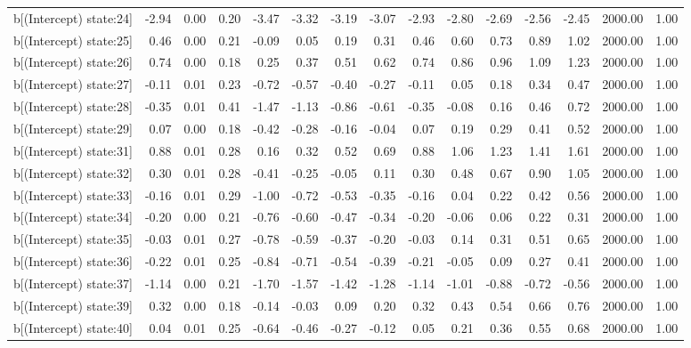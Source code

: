 \begin{table}[ht]
\begin{tabular}{rrrrrrrrrrrrrrr}
  b[(Intercept) state:24] & -2.94 & 0.00 & 0.20 & -3.47 & -3.32 & -3.19 & -3.07 & -2.93 & -2.80 & -2.69 & -2.56 & -2.45 & 2000.00 & 1.00 \\ 
  b[(Intercept) state:25] & 0.46 & 0.00 & 0.21 & -0.09 & 0.05 & 0.19 & 0.31 & 0.46 & 0.60 & 0.73 & 0.89 & 1.02 & 2000.00 & 1.00 \\ 
  b[(Intercept) state:26] & 0.74 & 0.00 & 0.18 & 0.25 & 0.37 & 0.51 & 0.62 & 0.74 & 0.86 & 0.96 & 1.09 & 1.23 & 2000.00 & 1.00 \\ 
  b[(Intercept) state:27] & -0.11 & 0.01 & 0.23 & -0.72 & -0.57 & -0.40 & -0.27 & -0.11 & 0.05 & 0.18 & 0.34 & 0.47 & 2000.00 & 1.00 \\ 
  b[(Intercept) state:28] & -0.35 & 0.01 & 0.41 & -1.47 & -1.13 & -0.86 & -0.61 & -0.35 & -0.08 & 0.16 & 0.46 & 0.72 & 2000.00 & 1.00 \\ 
  b[(Intercept) state:29] & 0.07 & 0.00 & 0.18 & -0.42 & -0.28 & -0.16 & -0.04 & 0.07 & 0.19 & 0.29 & 0.41 & 0.52 & 2000.00 & 1.00 \\ 
  b[(Intercept) state:31] & 0.88 & 0.01 & 0.28 & 0.16 & 0.32 & 0.52 & 0.69 & 0.88 & 1.06 & 1.23 & 1.41 & 1.61 & 2000.00 & 1.00 \\ 
  b[(Intercept) state:32] & 0.30 & 0.01 & 0.28 & -0.41 & -0.25 & -0.05 & 0.11 & 0.30 & 0.48 & 0.67 & 0.90 & 1.05 & 2000.00 & 1.00 \\ 
  b[(Intercept) state:33] & -0.16 & 0.01 & 0.29 & -1.00 & -0.72 & -0.53 & -0.35 & -0.16 & 0.04 & 0.22 & 0.42 & 0.56 & 2000.00 & 1.00 \\ 
  b[(Intercept) state:34] & -0.20 & 0.00 & 0.21 & -0.76 & -0.60 & -0.47 & -0.34 & -0.20 & -0.06 & 0.06 & 0.22 & 0.31 & 2000.00 & 1.00 \\ 
  b[(Intercept) state:35] & -0.03 & 0.01 & 0.27 & -0.78 & -0.59 & -0.37 & -0.20 & -0.03 & 0.14 & 0.31 & 0.51 & 0.65 & 2000.00 & 1.00 \\ 
  b[(Intercept) state:36] & -0.22 & 0.01 & 0.25 & -0.84 & -0.71 & -0.54 & -0.39 & -0.21 & -0.05 & 0.09 & 0.27 & 0.41 & 2000.00 & 1.00 \\ 
  b[(Intercept) state:37] & -1.14 & 0.00 & 0.21 & -1.70 & -1.57 & -1.42 & -1.28 & -1.14 & -1.01 & -0.88 & -0.72 & -0.56 & 2000.00 & 1.00 \\ 
  b[(Intercept) state:39] & 0.32 & 0.00 & 0.18 & -0.14 & -0.03 & 0.09 & 0.20 & 0.32 & 0.43 & 0.54 & 0.66 & 0.76 & 2000.00 & 1.00 \\ 
  b[(Intercept) state:40] & 0.04 & 0.01 & 0.25 & -0.64 & -0.46 & -0.27 & -0.12 & 0.05 & 0.21 & 0.36 & 0.55 & 0.68 & 2000.00 & 1.00 \\ 

\end{tabular}
\end{table}

